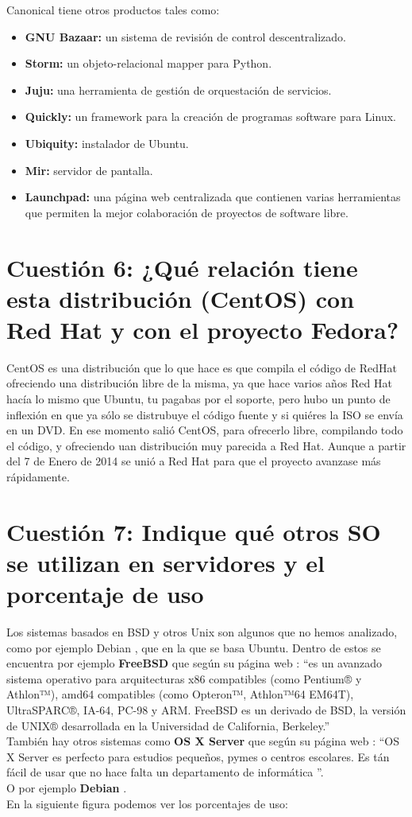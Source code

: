 Canonical tiene otros productos tales como: \cite{canonicalp}
\begin{itemize}
	\item \textbf{GNU Bazaar: } un sistema de revisión de control descentralizado.
	\item \textbf{Storm: } un objeto-relacional mapper para Python.
	\item \textbf{Juju: } una herramienta de gestión de orquestación de servicios.
	\item \textbf{Quickly: } un framework para la creación de programas software para Linux.
	\item \textbf{Ubiquity: } instalador de Ubuntu.
	\item \textbf{Mir: } servidor de pantalla.
	\item \textbf{Launchpad: } una página web centralizada que contienen varias herramientas que permiten la mejor colaboración de proyectos de software libre.
\end{itemize}

\section{Cuestión 6: ¿Qué relación tiene esta distribución (CentOS) con Red Hat y con el proyecto Fedora?}
CentOS es una distribución que lo que hace es que compila el código de RedHat ofreciendo una distribución libre de la misma, ya que hace varios años Red Hat hacía lo mismo que Ubuntu, tu pagabas por el soporte, pero hubo un punto de inflexión en que ya sólo se distrubuye el código fuente y si quiéres la ISO se envía en un DVD. En ese momento salió CentOS, para ofrecerlo libre, compilando todo el código, y ofreciendo uan distribución muy parecida a Red Hat. \cite{centOS} Aunque a partir del 7 de Enero de 2014 se unió a Red Hat para que el proyecto avanzase más rápidamente. \cite{centOS2}

\section{Cuestión 7: Indique qué otros SO se utilizan en servidores y el porcentaje de uso}
Los sistemas basados en BSD y otros Unix son algunos que no hemos analizado, como por ejemplo Debian \cite{debian}, que en la que se basa Ubuntu. Dentro de estos se encuentra por ejemplo \textbf{FreeBSD} que según su página web \cite{freebsd} : \textquotedblleft es un avanzado sistema operativo para arquitecturas x86 compatibles (como Pentium® y Athlon™), amd64 compatibles (como Opteron™, Athlon™64 EM64T), UltraSPARC®, IA-64, PC-98 y ARM. FreeBSD es un derivado de BSD, la versión de UNIX® desarrollada en la Universidad de California, Berkeley.\textquotedblright\\
También hay otros sistemas como \textbf{OS X Server} que según su página web \cite{osxserver}:  \textquotedblleft OS X Server es perfecto para estudios pequeños, pymes o centros escolares. Es tán fácil de usar que no hace falta un departamento de informática \textquotedblright.\\
O por ejemplo \textbf{Debian} \cite{debian}. \\ 
En la siguiente figura podemos ver los porcentajes de uso:

